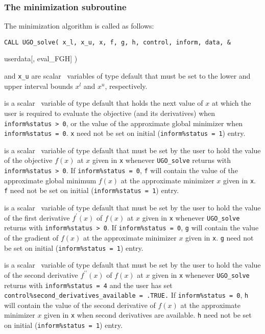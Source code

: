 \documentclass{galahad}
\newcommand{\packagename}{UGO}
\begin{document}

\subsubsection{The minimization subroutine}
The minimization algorithm is called as follows:
\vspace*{1mm}

\hspace{8mm}
{\tt CALL \packagename\_solve( x\_l, x\_u, x, f, g, h, control, inform, data, \&
\vspace*{-1mm}

\hspace{37mm}
                        userdata[, eval\_FGH] )}
\vspace*{-2mm}
\begin{description}
 and {\tt x\_u} are scalar \intentin\ variables
of type default \realdp that must be set to the lower and upper
interval bounds $x^l$ and $x^u$, respectively.

 is a scalar \intentinout\ variable of type default \realdp that holds
the next value of $x$ at which the user is required to evaluate the
objective (and its derivatives) when {\tt inform\%status > 0},
or the value of the approximate global minimizer
when {\tt inform\%status = 0}.
{\tt x} need not be set on initial ({\tt inform\%status = 1}) entry.

 is a scalar \intentinout\ variable of type default \realdp that must
be set by the user to hold the value of the objective $f(x)$ at $x$ given
in {\tt x} whenever {\tt \packagename\_solve} returns with
{\tt inform\%status > 0}.
If {\tt inform\%status = 0}, {\tt f} will contain the value of the
approximate global minimum $f(x)$ at the approximate minimizer $x$
given in {\tt x}.
{\tt f} need not be set on initial ({\tt inform\%status = 1}) entry.

 is a scalar \intentinout\ variable of type default \realdp that must
be set by the user to hold the value of the first derivative $f^{\prime}(x)$
of $f(x)$ at $x$ given in {\tt x} whenever {\tt \packagename\_solve} returns
with {\tt inform\%status > 0}. If {\tt inform\%status = 0}, {\tt g}
will contain the value of the gradient of
$f(x)$ at the approximate minimizer $x$ given in {\tt x}.
{\tt g} need not be set on initial ({\tt inform\%status = 1}) entry.

 is a scalar \intentinout\ variable of type default \realdp that must
be set by the user to hold the value of the second derivative $f^{\prime\prime}(x)$
of $f(x)$ at $x$ given in {\tt x} whenever {\tt \packagename\_solve} returns
with {\tt inform\%status = 4}
and the user has set {\tt control\%second\_derivatives\_available = .TRUE.}
If {\tt inform\%status = 0}, {\tt h}
will contain the value of the second derivative of
$f(x)$ at the approximate minimizer $x$ given in {\tt x} when
second derivatives are available.
{\tt h} need not be set on initial ({\tt inform\%status = 1}) entry.


\end{description}
\end{document}

